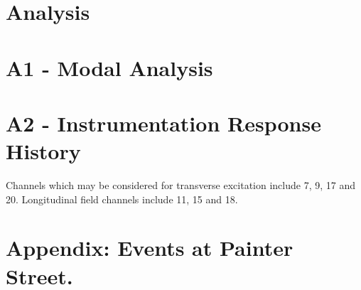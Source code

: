 \hypertarget{analysis}{%
\section{Analysis}\label{analysis}}

\hypertarget{a1---modal-analysis}{%
\section{A1 - Modal Analysis}\label{a1---modal-analysis}}

\hypertarget{a2---instrumentation-response-history}{%
\section{A2 - Instrumentation Response
History}\label{a2---instrumentation-response-history}}

Channels which may be considered for transverse excitation include 7, 9,
17 and 20. Longitudinal field channels include 11, 15 and 18.

\fi


\section{Appendix: Events at Painter Street.}

